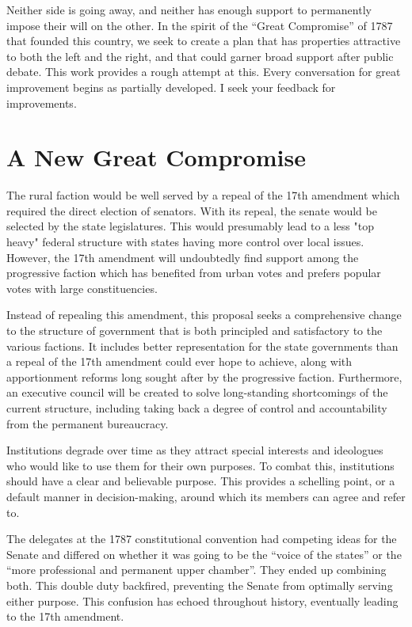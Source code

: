 \documentclass{article}
\begin{document}
Neither side is going away, and neither has enough support to permanently impose their will on the other. In the spirit of the “Great Compromise” of 1787 that founded this country, we seek to create a plan that has properties attractive to both the left and the right, and that could garner broad support after public debate. This work provides a rough attempt at this. Every conversation for great improvement begins as partially developed. I seek your feedback for improvements.

\section{A New Great Compromise}

The rural faction would be well served by a repeal of the 17th amendment\cite{Tucker}\cite{Virginia} which required the direct election of senators. With its repeal, the senate would be selected by the state legislatures. This would presumably lead to a less "top heavy" federal structure with states having more control over local issues. However, the 17th amendment will undoubtedly find support among the progressive faction which has benefited from urban votes and prefers popular votes with large constituencies\cite{Smith}.

Instead of repealing this amendment, this proposal seeks a comprehensive change to the structure of government that is both principled and satisfactory to the various factions. It includes better representation for the state governments than a repeal of the 17th amendment could ever hope to achieve, along with apportionment reforms long sought after by the progressive faction. Furthermore, an executive council will be created to solve long-standing shortcomings of the current structure, including taking back a degree of control and accountability from the permanent bureaucracy.

Institutions degrade over time as they attract special interests and ideologues who would like to use them for their own purposes. To combat this, institutions should have a clear and believable purpose. This provides a schelling point, or a default manner in decision-making, around which its members can agree and refer to\cite{Komoroske}. 

The delegates at the 1787 constitutional convention had competing ideas for the Senate and differed on whether it was going to be the “voice of the states” or the “more professional and permanent upper chamber”. They ended up combining both. This double duty backfired, preventing the Senate from optimally serving either purpose. This confusion has echoed throughout history, eventually leading to the 17th amendment.
\end{document}
